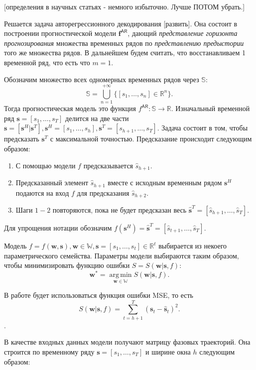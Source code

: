 \documentclass[12pt, twoside]{article}
\DeclareMathOperator*{\argmin}{arg\,min}
\begin{document}
[определения в научных статьях - немного избыточно. Лучше ПОТОМ убрать.]

Решается задача авторегрессионного декодирования [развить]. Она состоит в построении прогностической модели $\mathbf{f}^{\mathsf{AR}}$, дающий \textit{представление горизонта прогнозирования} множества временных рядов по \textit{представлению предыстории} того же множества рядов. В дальнейшем будем считать, что восстанавливаем 1 временной ряд, что есть что $m=1$.

Обозначим множество всех одномерных временных рядов через $\mathbb{S}$: \[\mathbb{S} = \bigcup\limits_{n=1}^{+\infty}\{[s_1, \dots, s_n] \in \mathbb{R}^{n}\}.\] Тогда прогностическая модель это функция $f^{\mathsf{AR}}: \mathbb{S} \to \mathbb{R}$. Изначальный временной ряд $\mathbf{s} = [s_1, \dots, s_T]$ делится на две части $\mathbf{s} = [\mathbf{s}^H|\mathbf{s}^T], \mathbf{s}^H = [s_1, \dots, s_h], \mathbf{s}^T = [s_{h+1}, \dots, s_T]$. Задача состоит в том, чтобы предсказать $\mathbf{s}^T$ с максимальной точностью. Предсказание происходит следующим образом:

\begin{enumerate}
    \item С помощью модели $f$ предсказывается $\hat{s}_{h+1}$.
    \item Предсказанный элемент $\hat{s}_{h+1}$ вместе с исходным временным рядом $\mathbf{s}^H$ подаются на вход $f$ для предсказания $\hat{s}_{h+2}$.
    \item Шаги $1-2$ повторяются, пока не будет предсказан весь $\hat{\mathbf{s}}^T=[\hat{s}_{h+1}, \dots, \hat{s}_{T}]$.
\end{enumerate}

Для упрощения нотации обозначим $f(\mathbf{s}^H)=\hat{\mathbf{s}}^T = [\hat{s}_{t+1}, \dots, \hat{s}_{T}]$.

Модель $f = f(\mathbf{w}, \mathbf{s}), \mathbf{w} \in \mathbb{W}, \mathbf{s}=[s_1, \dots, s_t]\in \mathbb{R}^t$ выбирается из некоего параметрического семейства.
Параметры модели выбираются таким образом, чтобы минимизировать функцию ошибки $S=S(\mathbf{w}|\mathbf{s},f)$:
$$
\mathbf{w^*} = \argmin\limits_{\mathbf{w} \in \mathbb{W}} S(\mathbf{w}|\mathbf{s},f).
$$


В работе будет использоваться функция ошибки MSE, то есть 
$$
S(\mathbf{w}|\mathbf{s},f) = \sum\limits_{t=h+1}^{T}(\mathbf{s}_t - \hat{\mathbf{s}}_t)^2.
$$.

В качестве входных данных модели получают матрицу фазовых траекторий. Она строится по временному ряду $\mathbf{s} = [s_1, \dots, s_{T}]$ и ширине окна $h$ следующим образом:
\end{document}
